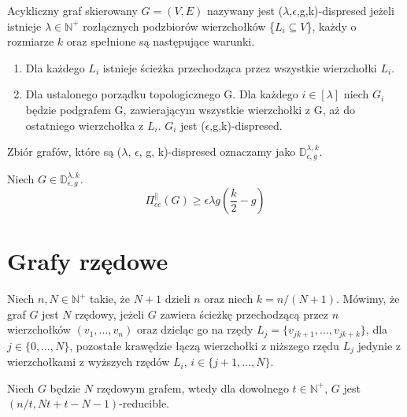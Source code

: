\begin{definition}
	Acykliczny graf skierowany $G = (V, E)$ nazywany jest ($\lambda$,$\epsilon$,g,k)-dispresed jeżeli istnieje $\lambda \in \mathbb{N}^{+} $ rozłącznych podzbiorów wierzchołków \{$ L_{i} \subseteq V$\},
	każdy o rozmiarze $k$ oraz spełnione są następujące warunki.
	\begin{enumerate}
		\item Dla każdego $L_{i}$ istnieje ścieżka przechodząca przez wszystkie wierzchołki $L_{i}$.
		
		\item Dla ustalonego porządku topologicznego G. Dla każdego $i \in [\lambda]$ niech
		$G_{i}$ będzie podgrafem G, zawierającym wszystkie wierzchołki z G, aż do ostatniego wierzchołka z $L_{i}$. $G_{i}$ jest ($\epsilon$,g,k)-dispresed.
	\end{enumerate}
	Zbiór grafów, które są ($\lambda$, $\epsilon$, g, k)-dispresed oznaczamy jako $\mathbb{D}_{\epsilon,g}^{\lambda,k}$.
\end{definition}

\begin{theorem} \cite[Twierdzenie 6]{depth} \label{1::disp}
	Niech $G \in \mathbb{D}_{\epsilon,g}^{\lambda,k}$.
	$$ \Pi_{cc}^{\parallel}(G) \geq \epsilon \lambda g \left( \frac{k}{2} - g \right) $$
\end{theorem}


\section{Grafy rzędowe}

\begin{definition} Niech $n, N \in \mathbb{N}^{+}$ takie, że $N + 1$ dzieli $n$ oraz niech $k=n/(N + 1)$. Mówimy, że graf $G$ jest $N$ rzędowy, jeżeli $G$ zawiera ścieżkę przechodzącą przez $n$ wierzchołków $(v_{1},\dots,v_{n})$ oraz dzieląc go na rzędy $L_{j} = \{v_{jk + 1},\dots,v_{jk + k} \}$, dla $j \in \{0,\dots,N\}$, pozostałe krawędzie łączą wierzchołki z niższego rzędu $L_{j}$ jedynie z wierzchołkami z wyższych rzędów $L_{i}$, $i \in \{ j+1,\dots,N \}$.
\end{definition}



\begin{lemma} \cite[Lemat 4.2]{alwen2016efficiently} \label{1::rze}
	Niech $G$ będzie $N$ rzędowym grafem, wtedy dla dowolnego $t \in \mathbb{N}^{+}$, $G$ jest $(n/t, N t + t - N -1)$-reducible.
\end{lemma}






